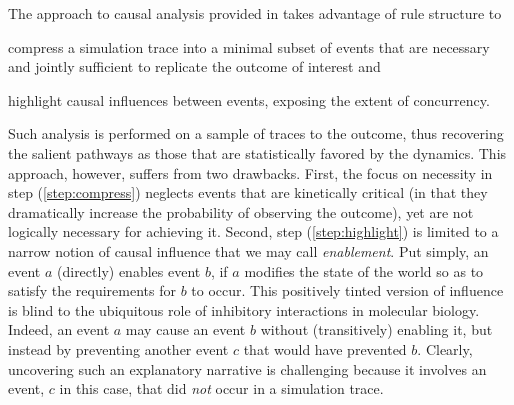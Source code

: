 The approach to causal analysis provided in
\cite{DBLP:conf/fsttcs/DanosFFHH12,DanosEtAl-CONCUR07} takes advantage
of rule structure to
\begin{inparaenum}[(i)]
\item \label{step:compress} compress a simulation trace into a minimal
  subset of events that are necessary and jointly sufficient to
  replicate the outcome of interest and
\item \label{step:highlight} highlight causal influences between
  events, exposing the extent of concurrency.
\end{inparaenum}
Such analysis is performed on a sample of traces to the outcome, thus recovering
the salient pathways as those that are statistically favored by the dynamics.
This approach, however, suffers from two drawbacks. First, the focus on
necessity in step (\ref{step:compress}) neglects events that are kinetically
critical (in that they dramatically increase the probability of observing the
outcome), yet are not logically necessary for achieving it. Second, step
(\ref{step:highlight}) is limited to a narrow notion of causal influence that we
may call \emph{enablement}. Put simply, an event $a$ (directly) enables event
$b$, if $a$ modifies the state of the world so as to satisfy the requirements
for $b$ to occur. This positively tinted version of influence is blind to the
ubiquitous role of inhibitory interactions in molecular biology.  Indeed, an
event $a$ may cause an event $b$ without (transitively) enabling it, but instead
by preventing another event $c$ that would have prevented $b$. Clearly,
uncovering such an explanatory narrative is challenging because it involves an
event, $c$ in this case, that did \emph{not} occur in a simulation trace.

